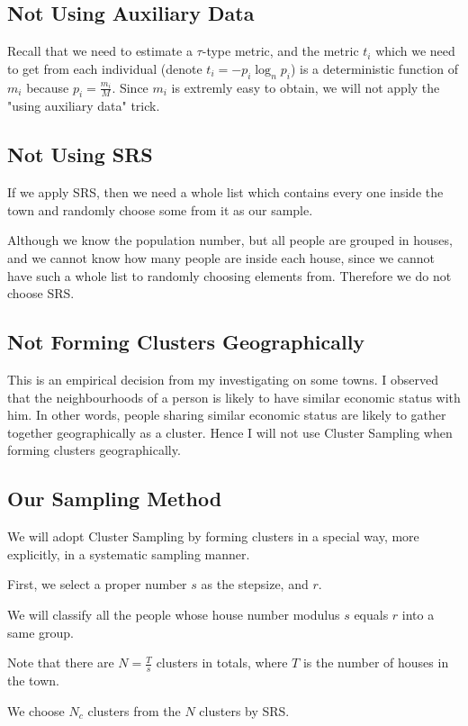 \documentclass[12pt]{article}%
\begin{document}
\subsection{Not Using Auxiliary Data}
Recall that we need to estimate a $\tau$-type metric, and the metric $t_i$ which we need to get from each individual (denote $t_i=-p_i\log_{n}{p_i}$) is a deterministic function of $m_i$ because $p_i=\frac{m_i}{M}$.
Since $m_i$ is extremly easy to obtain, we will not apply the "using auxiliary data" trick.

\subsection{Not Using SRS}
If we apply SRS, then we need a whole list which contains every one inside the town and randomly choose some from it as our sample.

Although we know the population number, but all people are grouped in houses, and we cannot know how many people are inside each house,
since we cannot have such a whole list to randomly choosing elements from. Therefore we do not choose SRS.

\subsection{Not Forming Clusters Geographically}
This is an empirical decision from my investigating on some towns. I observed that the neighbourhoods of a person is likely to have similar economic status with him.
In other words, people sharing similar economic status are likely to gather together geographically as a cluster. 
Hence I will not use Cluster Sampling when forming clusters geographically.

\subsection{Our Sampling Method}
We will adopt Cluster Sampling by forming clusters in a special way, more explicitly, in a systematic sampling manner.

First, we select a proper number $s$ as the stepsize, and $r$.

We will classify all the people whose house number modulus $s$ equals $r$ into a same group.

Note that there are $N=\frac{T}{s}$ clusters in totals, where $T$ is the number of houses in the town.

We choose $N_c$ clusters from the $N$ clusters by SRS. 
\end{document}

